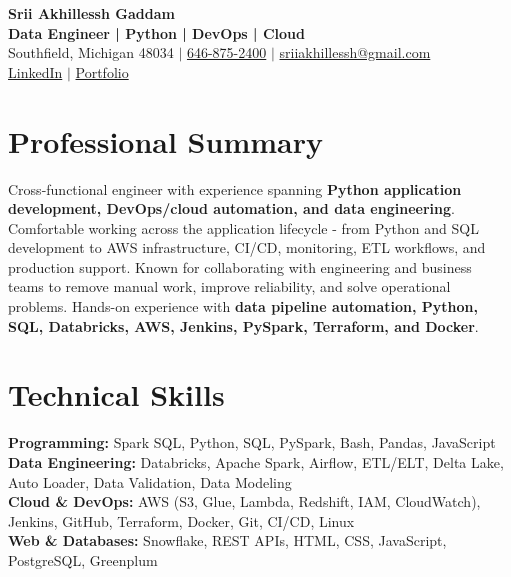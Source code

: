 \documentclass[letterpaper,10pt]{article}
\begin{document}
\fontsize{9.35pt}{10.45pt}\selectfont

\begin{center}
    {\LARGE \textbf{Srii Akhillessh Gaddam}} \\[-1pt]
    \textbf{Data Engineer | Python | DevOps | Cloud} \\[2pt]
    Southfield, Michigan 48034 $|$
    \href{tel:6468752400}{646-875-2400} $|$
    \href{mailto:sriiakhillessh@gmail.com}{sriiakhillessh@gmail.com} \\[1pt]
    \href{https://www.linkedin.com/in/srii-akhiilessh-gaddam-b48668191/}{LinkedIn} $|$
    \href{https://sriiakhillesshg.github.io/portfolio/}{Portfolio}
\end{center}
\vspace{-8pt}

\section{Professional Summary}
\small{Cross-functional engineer with experience spanning \textbf{Python application development, DevOps/cloud automation, and data engineering}. Comfortable working across the application lifecycle - from Python and SQL development to AWS infrastructure, CI/CD, monitoring, ETL workflows, and production support. Known for collaborating with engineering and business teams to remove manual work, improve reliability, and solve operational problems. Hands-on experience with \textbf{data pipeline automation, Python, SQL, Databricks, AWS, Jenkins, PySpark, Terraform, and Docker}.}

\section{Technical Skills}
\small{
\textbf{Programming:} Spark SQL, Python, SQL, PySpark, Bash, Pandas, JavaScript \\
\textbf{Data Engineering:} Databricks, Apache Spark, Airflow, ETL/ELT, Delta Lake, Auto Loader, Data Validation, Data Modeling \\
\textbf{Cloud \& DevOps:} AWS (S3, Glue, Lambda, Redshift, IAM, CloudWatch), Jenkins, GitHub, Terraform, Docker, Git, CI/CD, Linux \\
\textbf{Web \& Databases:} Snowflake, REST APIs, HTML, CSS, JavaScript, PostgreSQL, Greenplum
}

\end{document}
